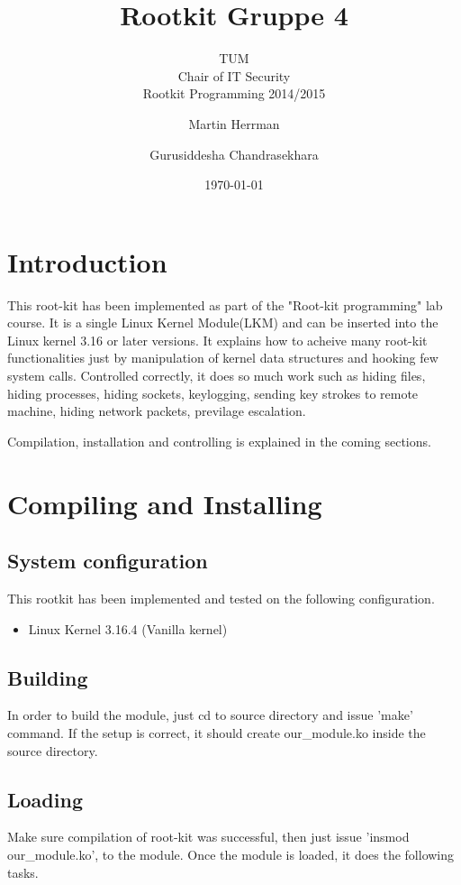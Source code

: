 \documentclass[10pt, letterpaper]{scrartcl}
\title{Rootkit Gruppe 4}
\subtitle{TUM \\Chair of IT Security\\  Rootkit Programming 2014/2015}
\author{Martin Herrman \and Gurusiddesha Chandrasekhara}
\date{\today}
\begin{document}
\maketitle
\tableofcontents
\newpage

\section{Introduction}
This root-kit has been implemented as part of the "Root-kit programming" lab course. 
It is a single Linux Kernel Module(LKM) and can be inserted into the Linux kernel 3.16 or later versions. 
It explains how to acheive many root-kit functionalities just by manipulation of kernel data structures and hooking few system calls. 
Controlled correctly, it does so much work such as hiding files, hiding processes, hiding sockets, keylogging, 
sending key strokes to remote machine, hiding network packets, previlage escalation.   

Compilation, installation and controlling is explained in the coming sections.

\section{Compiling and Installing}
\subsection{System configuration}
This rootkit has been implemented and tested on the following configuration.
\begin{itemize}
    \item Linux Kernel 3.16.4 (Vanilla kernel) 
\end{itemize}

\subsection{Building}
        In order to build the module, just cd to source directory and issue 'make' command. 
	If the setup is correct, it should create our\_module.ko inside the source directory. 

\subsection{Loading}
        Make sure compilation of root-kit was successful, then just issue 'insmod our\_module.ko', to the module. 
	Once the module is loaded, it does the following tasks. 
    
\end{document}

